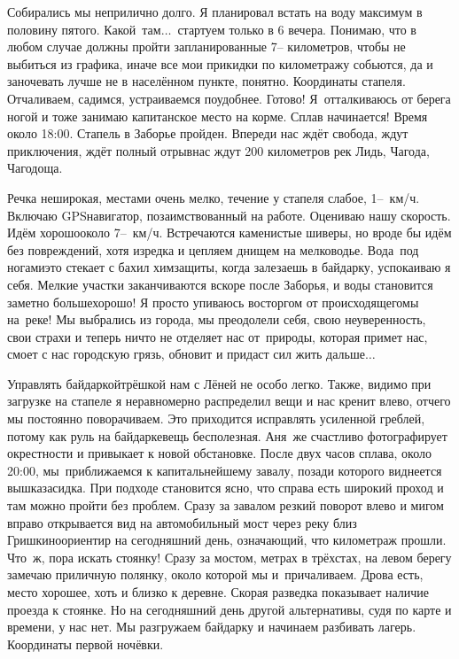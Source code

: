 Собирались мы неприлично долго. Я планировал встать на воду максимум в половину пятого. Какой~там$\ldots$~стартуем только в 6 вечера. Понимаю, что в любом случае должны пройти запланированные 7\thinspace\nobreakdash-- километров, чтобы не выбиться из графика, иначе все мои прикидки по километражу собьются, да и заночевать лучше не в населённом пункте, понятно. Координаты стапеля. Отчаливаем, садимся, устраиваемся поудобнее. Готово! Я~отталкиваюсь от берега ногой и тоже занимаю капитанское место на корме. Сплав начинается! Время около 18:00. Стапель в Заборье пройден. Впереди нас ждёт свобода, ждут приключения, ждёт полный отрыв\mdash нас ждут 200 километров рек Лидь, Чагода, Чагодоща. 

Речка неширокая, местами очень мелко, течение у стапеля слабое, 1\thinspace\nobreakdash--~км/ч. Включаю GPS\sdash навигатор, позаимствованный на работе. Оцениваю нашу скорость. Идём хорошо\mdash около 7\thinspace\nobreakdash--~км/ч. Встречаются каменистые шиверы, но вроде бы идём без повреждений, хотя изредка и цепляем днищем на мелководье. Вода~под ногами\mdash это стекает с бахил химзащиты, когда залезаешь в байдарку, успокаиваю я себя. Мелкие участки заканчиваются вскоре после Заборья, и воды становится заметно больше\mdash хорошо! Я просто упиваюсь восторгом от происходящего\mdash мы на~реке! Мы выбрались из города, мы преодолели себя, свою неуверенность, свои страхи и теперь ничто не отделяет нас от~природы, которая примет нас, смоет с нас городскую грязь, обновит и придаст сил жить дальше$\ldots$

Управлять байдаркой\sdash трёшкой нам с Лёней не особо легко. Также, видимо при загрузке на стапеле я неравномерно распределил вещи и нас кренит влево, отчего мы постоянно поворачиваем. Это приходится исправлять усиленной греблей, потому как руль на байдарке\mdash вещь бесполезная. Аня~же счастливо фотографирует окрестности и привыкает к новой обстановке. 
\newpage
После двух часов сплава, около 20:00, мы~приближаемся к капитальнейшему завалу, позади которого виднеется вышка\sdash засидка. При подходе становится ясно, что справа есть широкий проход и там можно пройти  без проблем. Сразу за завалом резкий поворот влево и мигом вправо открывается вид на автомобильный мост через реку близ Гришкино\mdash ориентир на сегодняшний день, означающий, что километраж прошли. Что~ж, пора искать стоянку! Сразу за мостом, метрах в трёхстах, на левом берегу замечаю приличную полянку, около которой мы и~причаливаем. Дрова есть, место хорошее, хоть и близко к деревне. Скорая разведка показывает наличие проезда к стоянке. Но на сегодняшний день другой альтернативы, судя по карте и времени, у нас нет. Мы разгружаем байдарку и начинаем разбивать лагерь. Координаты первой ночёвки. 

